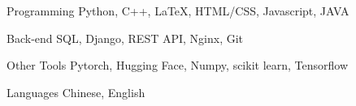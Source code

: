 

\begin{cvskills}

  \cvskill
    {Programming} %
    {Python, C++, LaTeX, HTML/CSS, Javascript, JAVA} %

  \cvskill
    {Back-end} %
    {SQL, Django, REST API, Nginx, Git} %

  \cvskill
    {Other Tools} %
    {Pytorch, Hugging Face, Numpy, scikit learn, Tensorflow} %

  \cvskill
    {Languages} %
    {Chinese, English} %

\end{cvskills}